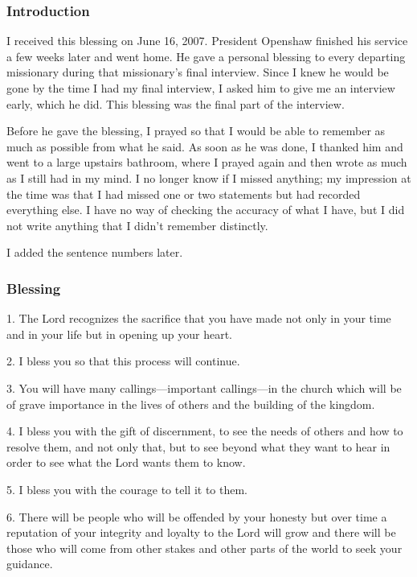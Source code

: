		\subsubsection{Introduction}
		
			I received this blessing on June 16, 2007. President Openshaw finished his service a few weeks later and went home. He gave a personal blessing to every departing missionary during that missionary's final interview. Since I knew he would be gone by the time I had my final interview, I asked him to give me an interview early, which he did. This blessing was the final part of the interview. 

			Before he gave the blessing, I prayed so that I would be able to remember as much as possible from what he said. As soon as he was done, I thanked him and went to a large upstairs bathroom, where I prayed again and then wrote as much as I still had in my mind. I no longer know if I missed anything; my impression at the time was that I had missed one or two statements but had recorded everything else. I have no way of checking the accuracy of what I have, but I did not write anything that I didn't remember distinctly. 
						
			I added the sentence numbers later.
		
		\subsubsection{Blessing}
		
			1. The Lord recognizes the sacrifice that you have made not only in your time and in your life but in opening up your heart.

			2. I bless you so that this process will continue.

			3. You will have many callings---important callings---in the church which will be of grave importance in the lives of others and the building of the kingdom.

			4. I bless you with the gift of discernment, to see the needs of others and how to resolve them, and not only that, but to see beyond what they want to hear in order to see what the Lord wants them to know.

			5. I bless you with the courage to tell it to them.

			6. There will be people who will be offended by your honesty but over time a reputation of your integrity and loyalty to the Lord will grow and there will be those who will come from other stakes and other parts of the world to seek your guidance.

